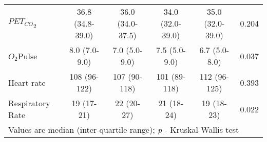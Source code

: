 \begin{sidewaystable}[p]
\begin{tabular}{|l| c c c c |c|}
		${PET_{CO}}_2$                 & 36.8 (34.8-39.0)    & 36.0 (34.0-37.5)    & 34.0 (32.0-39.0)    & 35.0 (32.0-39.0)    & 0.204      \\
		$O_2$Pulse                     & 8.0 (7.0-9.0)       & 7.0 (5.0-9.0)       & 7.5 (5.0-9.0)       & 6.7 (5.0-8.0)       & 0.037      \\
		Heart rate                     & 108 (96-122)        & 107 (90-118)        & 101 (89-118)        & 112 (96-125)        & 0.393      \\
		Respiratory Rate               & 19 (17-21)          & 22 (20-27)          & 21 (18-24)          & 19 (18-23)          & 0.022      \\ \hline
		\multicolumn{6}{l}{Values are median (inter-quartile range); \textit{p} - Kruskal-Wallis test}
	\end{tabular}
\end{sidewaystable}


